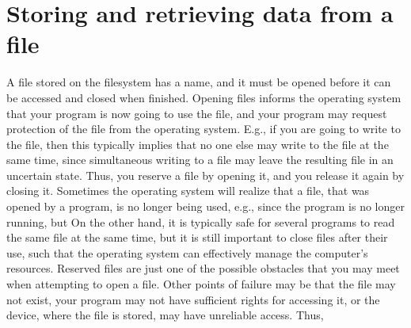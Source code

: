 \section{Storing and retrieving data from a file}
A file stored on the filesystem has a name, and it must be opened before it can be accessed and closed when finished. Opening files informs the operating system that your program is now going to use the file, and your program may request protection of the file from the operating system. E.g., if you are going to write to the file, then this typically implies that no one else may write to the file at the same time, since simultaneous writing to a file may leave the resulting file in an uncertain state. Thus, you reserve a file by opening it, and you release it again by closing it. Sometimes the operating system will realize that a file, that was opened by a program, is no longer being used, e.g., since the program is no longer running, but  On the other hand, it is typically safe for several programs to read the same file at the same time, but it is still important to close files after their use, such that the operating system can effectively manage the computer's resources. Reserved files are just one of the possible obstacles that you may meet when attempting to open a file. Other points of failure may be that the file may not exist, your program may not have sufficient rights for accessing it, or the device, where the file is stored, may have unreliable access. Thus, 

